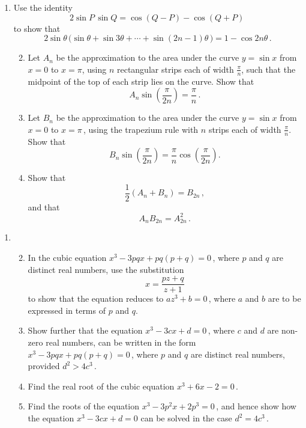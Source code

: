 \documentclass[a4, 11pt]{report}
\newlength{\qspace}
\newcounter{qnumber}
\newenvironment{question}%
 {\vspace{\qspace}
  \begin{enumerate}[\bfseries 1\quad][10]%
    \setcounter{enumi}{\value{qnumber}}%
    \item%
 }
{
  \end{enumerate}
  \filbreak
  \stepcounter{qnumber}
 }
\newenvironment{questionparts}[1][1]%
 {
  \begin{enumerate}[\bfseries (i)]%
    \setcounter{enumii}{#1}
    \addtocounter{enumii}{-1}
    \setlength{\itemsep}{5mm}
    \setlength{\parskip}{8pt}
 }
 {
  \end{enumerate}
 }
\begin{document}
\begin{question}
Use the identity
\[
2 \sin P\,\sin Q = \cos(Q-P)-\cos(Q+P)\,
\] 
to show that
 \[
2\sin\theta
\,\big  (\sin\theta + \sin 3\theta + \cdots + \sin (2n-1)\theta\,\big ) =
 1-\cos 2n\theta
\,.
\]        
\begin{questionparts}
\item Let $A_n$ be the approximation to the area under the 
curve $y=\sin x$ from $x=0$ to $x=\pi$, 
using $n$ rectangular strips each of width 
$\frac{{\displaystyle \pi}}{\displaystyle n}$, such that the
midpoint of the top of each strip lies on the curve.
Show that
\[
A_n \sin \left( \frac{\pi}{2n} \right) = \frac \pi n\,.
\]

\item Let $B_n$ be the approximation to the 
area under the curve $y=\sin x$ 
from $x=0$ to $x=\pi\,$, using the trapezium rule with $n$ 
strips each of width $\frac{\displaystyle \pi}{ \displaystyle n}$.
Show that 
\[B_n \sin \left( \frac{\pi}{2n} \right) 
= 
\frac{\pi}{n} \cos \left( \frac{\pi}{2n} \right)
.
\]
\item Show that
\[
\frac{1}{2}(A_n + B_n) = B_{2n}\,,
\]
and that
\[
 A_n B_{2n} = A^2_{2n}\, .
\]

\end{questionparts}

\end{question}




\begin{question}

\begin{questionparts}
\item
 In the cubic equation $x^3-3pqx+pq(p+q)=0\,$, 
where $p$ and $q$ are distinct real numbers, 
use the substitution
\[
x=\frac{pz+q}{z+1}
\]
to show that the equation reduces to $az^3+b = 0\,$, 
where $a$ and $b$ are to be expressed in terms of $p$ and $q$.

\item
Show further that the equation $x^3 - 3cx + d = 0\,$, where $c$ and $d$ 
are non-zero real numbers,  
can be written in the form 
$x^3-3pqx+pq(p+q)=0\,$, 
where $p$ and $q$ are distinct real numbers, provided $d^2 > 4c^3\,$.

\item Find the real root of the cubic equation $x^3+6x-2=0\,$.

\item  Find the roots of the equation $x^3 - 3p^2x +2p^3=0\,$, 
and hence show how the equation $x^3 - 3cx + d = 0$ 
can be solved in the case $d^2 = 4c^3\,$.


\end{questionparts}

\end{question}
\end{document}
